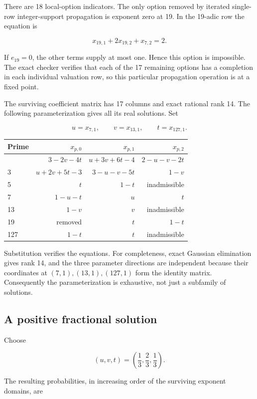 There are 18 local-option indicators. The only option removed by iterated single-row integer-support propagation is exponent zero at 19. In the 19-adic row the equation is

\[
x_{19,1}+2x_{19,2}+x_{7,2}=2.
\]

If \(e_{19}=0\), the other terms supply at most one. Hence this option is impossible. The exact checker verifies that each of the 17 remaining options has a completion in each individual valuation row, so this particular propagation operation is at a fixed point.

The surviving coefficient matrix has 17 columns and exact rational rank 14. The following parameterization gives all its real solutions. Set

\[
u=x_{7,1},\qquad v=x_{13,1},\qquad t=x_{127,1}.
\]

\begin{longtable}[]{@{}lrrr@{}}
\toprule\noalign{}
Prime & \(x_{p,0}\) & \(x_{p,1}\) & \(x_{p,2}\) \\
\midrule\noalign{}
\endhead
\bottomrule\noalign{}
\endlastfoot
2 & \(3-2v-4t\) & \(u+3v+6t-4\) & \(2-u-v-2t\) \\
3 & \(u+2v+5t-3\) & \(3-u-v-5t\) & \(1-v\) \\
5 & \(t\) & \(1-t\) & inadmissible \\
7 & \(1-u-t\) & \(u\) & \(t\) \\
13 & \(1-v\) & \(v\) & inadmissible \\
19 & removed & \(t\) & \(1-t\) \\
127 & \(1-t\) & \(t\) & inadmissible \\
\end{longtable}

Substitution verifies the equations. For completeness, exact Gaussian elimination gives rank 14, and the three parameter directions are independent because their coordinates at \((7,1),(13,1),(127,1)\) form the identity matrix. Consequently the parameterization is exhaustive, not just a subfamily of solutions.

\subsection{A positive fractional solution}\label{fractional:a-positive-fractional-solution}

Choose

\[
(u,v,t)=\left(\frac13,\frac23,\frac13\right).
\]

The resulting probabilities, in increasing order of the surviving exponent domains, are

